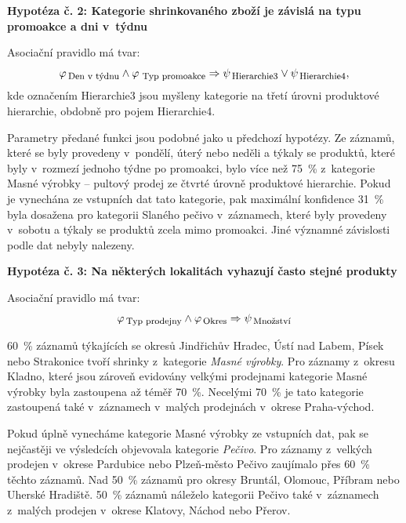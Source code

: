 \vspace*{1em}

\textbf{Hypotéza č. 2: Kategorie shrinkovaného zboží je závislá na typu promoakce a dni v~týdnu}

Asociační pravidlo má tvar:
\begin{equation}
    \varphi_{\mbox{\,\footnotesize Den v~týdnu}} \land \varphi_{\,\mbox{\,\footnotesize Typ promoakce}} \Rightarrow \psi_{\mbox{\,\footnotesize Hierarchie3}} \lor \psi_{\mbox{\,\footnotesize Hierarchie4}},
\end{equation}
kde označením Hierarchie3 jsou myšleny kategorie na třetí úrovni produktové hierarchie, obdobně pro pojem Hierarchie4.

Parametry předané funkci jsou podobné jako u předchozí hypotézy. Ze záznamů, které se byly provedeny v~pondělí, úterý nebo neděli a týkaly se produktů, které byly v~rozmezí  jednoho týdne po promoakci, bylo více než 75~\% z~kategorie Masné výrobky -- pultový prodej ze čtvrté úrovně produktové hierarchie. Pokud je vynechána ze vstupních dat tato kategorie, pak maximální konfidence 31~\% byla dosažena pro kategorii Slaného pečivo v~záznamech, které byly provedeny v~sobotu a týkaly se produktů zcela mimo promoakci. Jiné významné závislosti podle dat nebyly nalezeny.

\vspace*{1em}

\textbf{Hypotéza č. 3: Na některých lokalitách vyhazují často stejné produkty}

Asociační pravidlo má tvar:
\begin{equation}
    \varphi_{\mbox{\,\footnotesize Typ prodejny}} \land \varphi_{\,\mbox{\footnotesize Okres}} \Rightarrow \psi_{\mbox{\,\footnotesize Množství}}
\end{equation}

60~\% záznamů týkajících se okresů Jindřichův Hradec, Ústí nad Labem, Písek nebo Strakonice tvoří shrinky z~kategorie \emph{Masné výrobky}. Pro záznamy z~okresu Kladno, které jsou zároveň evidovány velkými prodejnami kategorie Masné výrobky byla zastoupena až téměř 70~\%. Necelými 70~\% je tato kategorie zastoupená také v~záznamech v~malých prodejnách v~okrese Praha-východ.

Pokud úplně vynecháme kategorie Masné výrobky ze vstupních dat, pak se nejčastěji ve výsledcích objevovala kategorie \emph{Pečivo}. Pro záznamy z~velkých prodejen v~okrese Pardubice nebo Plzeň-město Pečivo zaujímalo přes 60~\% těchto záznamů. Nad 50~\% záznamů pro okresy Bruntál, Olomouc, Příbram nebo Uherské Hradiště. 50~\% záznamů náleželo kategorii Pečivo také v~záznamech z~malých prodejen v~okrese Klatovy, Náchod nebo Přerov.

